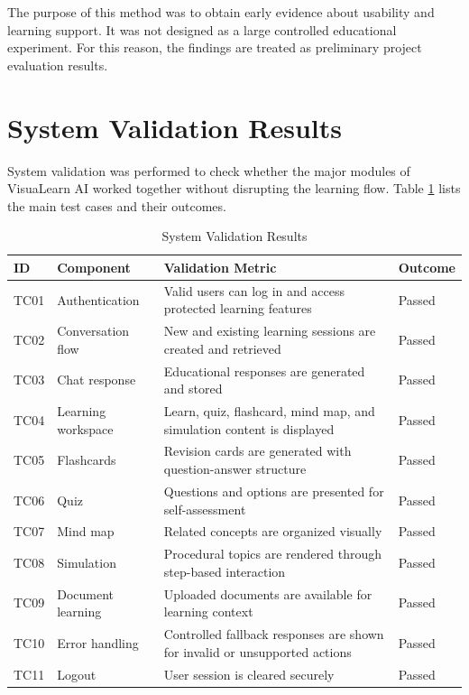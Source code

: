 The purpose of this method was to obtain early evidence about usability and learning support. It was not designed as a large controlled educational experiment. For this reason, the findings are treated as preliminary project evaluation results.

\section[System Validation Results]{\textbf{System Validation Results}}
System validation was performed to check whether the major modules of VisuaLearn AI worked together without disrupting the learning flow. Table \ref{tab:functional-validation} lists the main test cases and their outcomes.

\begin{longtable}{p{1.1cm}p{4cm}p{5.3cm}p{2.3cm}}
\caption{System Validation Results}
\label{tab:functional-validation}\\
\toprule
\textbf{ID} & \textbf{Component} & \textbf{Validation Metric} & \textbf{Outcome}\\
\midrule
TC01 & Authentication & Valid users can log in and access protected learning features & Passed\\
TC02 & Conversation flow & New and existing learning sessions are created and retrieved & Passed\\
TC03 & Chat response & Educational responses are generated and stored & Passed\\
TC04 & Learning workspace & Learn, quiz, flashcard, mind map, and simulation content is displayed & Passed\\
TC05 & Flashcards & Revision cards are generated with question-answer structure & Passed\\
TC06 & Quiz & Questions and options are presented for self-assessment & Passed\\
TC07 & Mind map & Related concepts are organized visually & Passed\\
TC08 & Simulation & Procedural topics are rendered through step-based interaction & Passed\\
TC09 & Document learning & Uploaded documents are available for learning context & Passed\\
TC10 & Error handling & Controlled fallback responses are shown for invalid or unsupported actions & Passed\\
TC11 & Logout & User session is cleared securely & Passed\\
\bottomrule
\end{longtable}

